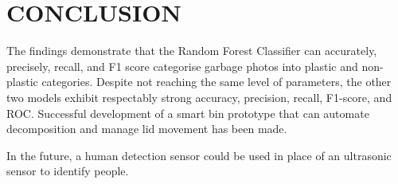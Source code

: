 \chapter{CONCLUSION}
\thispagestyle{empty}
\par The findings demonstrate that the Random Forest Classifier can accurately, precisely, recall, and F1 score categorise garbage photos into plastic and non-plastic categories. Despite not reaching the same level of parameters, the other two models exhibit respectably strong accuracy, precision, recall, F1-score, and ROC. Successful development of a smart bin prototype that can automate decomposition and manage lid movement has been made.
\par In the future, a human detection sensor could be used in place of an ultrasonic sensor to identify people.